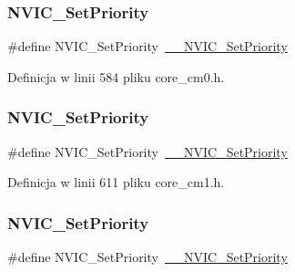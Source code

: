 \subsubsection{\texorpdfstring{N\+V\+I\+C\+\_\+\+Set\+Priority}{NVIC\_SetPriority}\hspace{0.1cm}{\footnotesize\ttfamily [1/12]}}
{\footnotesize\ttfamily \#define N\+V\+I\+C\+\_\+\+Set\+Priority~\hyperlink{group___c_m_s_i_s___core___n_v_i_c_functions_ga505338e23563a9c074910fb14e7d45fd}{\+\_\+\+\_\+\+N\+V\+I\+C\+\_\+\+Set\+Priority}}



Definicja w linii 584 pliku core\+\_\+cm0.\+h.

\mbox{\label{group___c_m_s_i_s___core___n_v_i_c_functions_gae0e9d0e2f7b6133828c71b57d4941c35}} 
\subsubsection{\texorpdfstring{N\+V\+I\+C\+\_\+\+Set\+Priority}{NVIC\_SetPriority}\hspace{0.1cm}{\footnotesize\ttfamily [2/12]}}
{\footnotesize\ttfamily \#define N\+V\+I\+C\+\_\+\+Set\+Priority~\hyperlink{group___c_m_s_i_s___core___n_v_i_c_functions_ga505338e23563a9c074910fb14e7d45fd}{\+\_\+\+\_\+\+N\+V\+I\+C\+\_\+\+Set\+Priority}}



Definicja w linii 611 pliku core\+\_\+cm1.\+h.

\mbox{\label{group___c_m_s_i_s___core___n_v_i_c_functions_gae0e9d0e2f7b6133828c71b57d4941c35}} 
\subsubsection{\texorpdfstring{N\+V\+I\+C\+\_\+\+Set\+Priority}{NVIC\_SetPriority}\hspace{0.1cm}{\footnotesize\ttfamily [3/12]}}
{\footnotesize\ttfamily \#define N\+V\+I\+C\+\_\+\+Set\+Priority~\hyperlink{group___c_m_s_i_s___core___n_v_i_c_functions_ga505338e23563a9c074910fb14e7d45fd}{\+\_\+\+\_\+\+N\+V\+I\+C\+\_\+\+Set\+Priority}}



